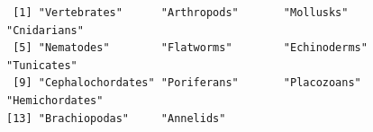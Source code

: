 \documentclass[
  letterpaper,
  DIV=11,
  numbers=noendperiod]{scrreprt}
\newenvironment{Shaded}{}{}
\newcommand{\DocumentationTok}[1]{\textcolor[rgb]{0.64,0.20,0.25}{#1}}
\newcommand{\FunctionTok}[1]{\textcolor[rgb]{0.38,0.69,0.94}{#1}}
\newcommand{\NormalTok}[1]{\textcolor[rgb]{0.67,0.70,0.75}{#1}}
\newcommand{\OtherTok}[1]{\textcolor[rgb]{0.15,0.68,0.38}{#1}}
\newcommand{\SpecialCharTok}[1]{\textcolor[rgb]{0.34,0.71,0.76}{#1}}
\newcommand{\StringTok}[1]{\textcolor[rgb]{0.60,0.76,0.47}{#1}}
\begin{document}
\begin{Shaded}
\end{Shaded}

\begin{verbatim}
 [1] "Vertebrates"      "Arthropods"       "Mollusks"         "Cnidarians"      
 [5] "Nematodes"        "Flatworms"        "Echinoderms"      "Tunicates"       
 [9] "Cephalochordates" "Poriferans"       "Placozoans"       "Hemichordates"   
[13] "Brachiopodas"     "Annelids"        
\end{verbatim}
\end{document}
